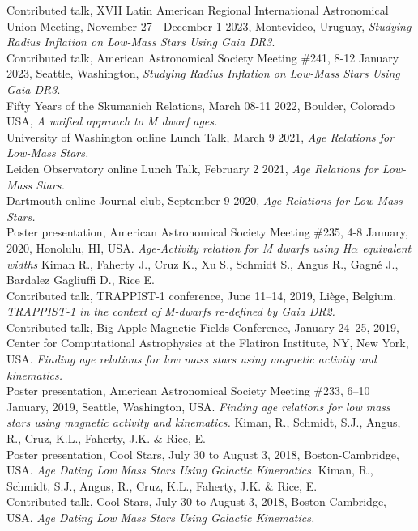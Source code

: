 \documentclass[10pt]{cv}
\begin{document}
\begin{llist}
Contributed talk, XVII Latin American Regional International Astronomical Union Meeting, November 27 - December 1 2023, Montevideo, Uruguay, \textit{Studying Radius Inflation on Low-Mass Stars Using Gaia DR3}.\\
Contributed talk, American Astronomical Society Meeting \#241, 8-12 January 2023, Seattle, Washington, \textit{Studying Radius Inflation on Low-Mass Stars Using Gaia DR3}.\\
Fifty Years of the Skumanich Relations, March 08-11 2022, Boulder, Colorado USA, \textit{A unified approach to M dwarf ages.}\\
University of Washington online Lunch Talk, March 9 2021, \textit{Age Relations for Low-Mass Stars.}\\
Leiden Observatory online Lunch Talk, February 2 2021, \textit{Age Relations for Low-Mass Stars.}\\
Dartmouth online Journal club, September 9 2020, \textit{Age Relations for Low-Mass Stars.}\\
Poster presentation, American Astronomical Society Meeting \#235, 4-8 January, 2020, Honolulu, HI, USA. \textit{Age-Activity relation for M dwarfs using H$\alpha$ equivalent widths} Kiman R., Faherty J., Cruz K., Xu S., Schmidt S., Angus R., Gagn\'e J., Bardalez Gagliuffi D., Rice E.\\
Contributed talk, TRAPPIST-1 conference, June 11--14, 2019, Li\`ege, Belgium. \textit{TRAPPIST-1 in the context of M-dwarfs re-defined by Gaia DR2.}\\
Contributed talk, Big Apple Magnetic Fields Conference, January 24--25, 2019, Center for Computational Astrophysics at the Flatiron Institute, NY, New York, USA. \textit{Finding age relations for low mass stars using magnetic activity and kinematics.}\\
Poster presentation, American Astronomical Society Meeting \#233, 6--10 January, 2019, Seattle, Washington, USA. \textit{Finding age relations for low mass stars using magnetic activity and kinematics.} Kiman, R., Schmidt, S.J., Angus, R., Cruz, K.L., Faherty, J.K. \& Rice, E.\\
Poster presentation, Cool Stars, July 30 to August 3, 2018, Boston-Cambridge, USA. \textit{Age Dating Low Mass Stars Using Galactic Kinematics.} Kiman, R., Schmidt, S.J., Angus, R., Cruz, K.L., Faherty, J.K. \& Rice, E.\\
Contributed talk, Cool Stars, July 30 to August 3, 2018, Boston-Cambridge, USA. \textit{Age Dating Low Mass Stars Using Galactic Kinematics.} \\

\end{llist}
\end{document}
